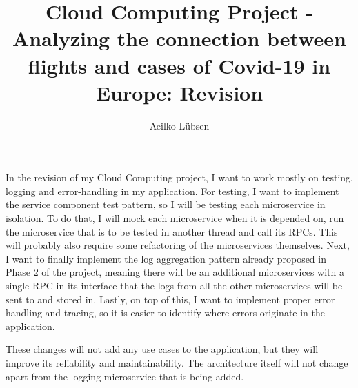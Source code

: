 \documentclass[12pt]{article}
\title{Cloud Computing Project - Analyzing the connection between flights and cases of Covid-19 in Europe: Revision}
\author{Aeilko Lübsen}
\begin{document}
	\maketitle
	
	In the revision of my Cloud Computing project, I want to work mostly on testing, logging and error-handling in my application. For testing, I want to implement the service component test pattern, so I will be testing each microservice in isolation. To do that, I will mock each microservice when it is depended on, run the microservice that is to be tested in another thread and call its RPCs. This will probably also require some refactoring of the microservices themselves. Next, I want to finally implement the log aggregation pattern already proposed in Phase 2 of the project, meaning there will be an additional microservices with a single RPC in its interface that the logs from all the other microservices will be sent to and stored in. Lastly, on top of this, I want to implement proper error handling and tracing, so it is easier to identify where errors originate in the application.
	
	These changes will not add any use cases to the application, but they will improve its reliability and maintainability. The architecture itself will not change apart from the logging microservice that is being added.
	
	
\end{document}
